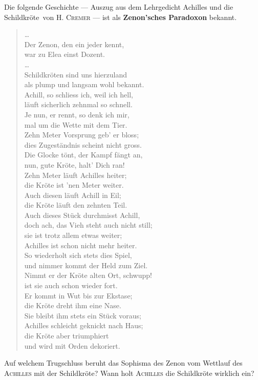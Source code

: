 \documentclass[%
11pt,%
twoside,%
titlepage,%
german,%
headsepline%
]{scrartcl}
\begin{document}
\begin{ueb}
Die folgende Geschichte --- Auszug aus dem Lehrgedicht \glqq Achilles und die Schildkr\"ote\grqq\ von \textsc{H. Cremer} ---  ist als \textbf{Zenon'sches Paradoxon} bekannt.

\begin{quote}
\begin{center}
\dots\\
Der Zenon, den ein jeder kennt,\\
war zu Elea einst Dozent.\\
\dots\\
Schildkr\"oten sind uns hierzuland\\
als plump und langsam wohl bekannt.\\
Achill, so schliess ich, weil ich hell,\\
l\"auft sicherlich zehnmal so schnell.\\
Je nun, er rennt, so denk ich mir,\\
mal um die Wette mit dem Tier.\\
Zehn Meter Vorsprung geb' er bloss;\\
dies Zugest\"andnis scheint nicht gross.\\
Die Glocke t\"ont, der Kampf f\"angt an,\\
nun, gute Kr\"ote, halt' Dich ran!\\
Zehn Meter l\"auft Achilles heiter;\\
die Kr\"ote ist 'nen Meter weiter.\\
Auch diesen l\"auft Achill in Eil;\\
die Kr\"ote l\"auft den zehnten Teil.\\
Auch dieses St\"uck durchmisst Achill,\\
doch ach, das Vieh steht auch nicht still;\\
sie ist trotz allem etwas weiter;\\
Achilles ist schon nicht mehr heiter.\\
So wiederholt sich stets dies Spiel,\\
und nimmer kommt der Held zum Ziel.\\
Nimmt er der Kr\"ote alten Ort, schwupp!\\
ist sie auch schon wieder fort.\\
Er kommt in Wut bis zur Ekstase;\\
die Kr\"ote dreht ihm eine Nase.\\
Sie bleibt ihm stets ein St\"uck voraus;\\
Achilles schleicht geknickt nach Haus;\\
die Kr\"ote aber triumphiert\\
und wird mit Orden dekoriert.
\end{center}
\end{quote}
Auf welchem Trugschluss beruht das Sophisma des Zenon vom Wettlauf des \textsc{Achilles} mit der Schildkr\"ote? Wann holt \textsc{Achilles} die Schildkr\"ote wirklich ein?
\end{ueb}
\end{document}
